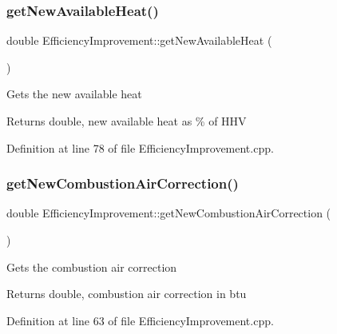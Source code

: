 \mbox{\label{class_efficiency_improvement_a37df0eb5d1dc43627e947a610f2a9c08}} 
\subsubsection{\texorpdfstring{get\+New\+Available\+Heat()}{getNewAvailableHeat()}}
{\footnotesize\ttfamily double Efficiency\+Improvement\+::get\+New\+Available\+Heat (\begin{DoxyParamCaption}{ }\end{DoxyParamCaption})}

Gets the new available heat

\begin{DoxyReturn}{Returns}
double, new available heat as \% of H\+HV 
\end{DoxyReturn}


Definition at line 78 of file Efficiency\+Improvement.\+cpp.

\mbox{\label{class_efficiency_improvement_abcbe174b3f94a20679dff0f5bff6a330}} 
\subsubsection{\texorpdfstring{get\+New\+Combustion\+Air\+Correction()}{getNewCombustionAirCorrection()}}
{\footnotesize\ttfamily double Efficiency\+Improvement\+::get\+New\+Combustion\+Air\+Correction (\begin{DoxyParamCaption}{ }\end{DoxyParamCaption})}

Gets the combustion air correction

\begin{DoxyReturn}{Returns}
double, combustion air correction in btu 
\end{DoxyReturn}


Definition at line 63 of file Efficiency\+Improvement.\+cpp.

